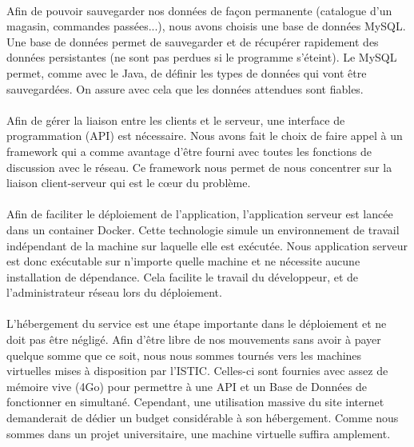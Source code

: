 \documentclass[a4paper, 12pt]{article}
\begin{document}
\paragraph{}Afin de pouvoir sauvegarder nos données de façon permanente (catalogue d’un magasin, commandes passées...), nous avons choisis une base de données MySQL. Une base de données permet de sauvegarder et de récupérer rapidement des données persistantes (ne sont pas perdues si le programme s'éteint).  Le MySQL permet, comme avec le Java, de définir les types de données qui vont être sauvegardées. On assure avec cela que les données attendues sont fiables.

\paragraph{}Afin de gérer la liaison entre les clients et le serveur, une interface de programmation (API) est nécessaire. Nous avons fait le choix de faire appel à un framework qui a comme avantage d’être fourni avec toutes les fonctions de discussion avec le réseau. Ce framework nous permet de nous concentrer sur la liaison client-serveur qui est le cœur du problème.

\paragraph{}Afin de faciliter le déploiement de l’application, l’application serveur est lancée dans un container Docker. Cette technologie simule un environnement de travail indépendant de la machine sur laquelle elle est exécutée. Nous application serveur est donc exécutable sur n’importe quelle machine et ne nécessite aucune installation de dépendance. Cela facilite le travail du développeur, et de l’administrateur réseau lors du déploiement.

\paragraph{}L’hébergement du service est une étape importante dans le déploiement et ne doit pas être négligé. Afin d’être libre de nos mouvements sans avoir à payer quelque somme que ce soit, nous nous sommes tournés vers les machines virtuelles mises à disposition par l’ISTIC. Celles-ci sont fournies avec assez de mémoire vive (4Go) pour permettre à une API et un Base de Données de fonctionner en simultané. Cependant, une utilisation massive du site internet demanderait de dédier un budget considérable à son hébergement. Comme nous sommes dans un projet universitaire, une machine virtuelle suffira amplement.
\end{document}
